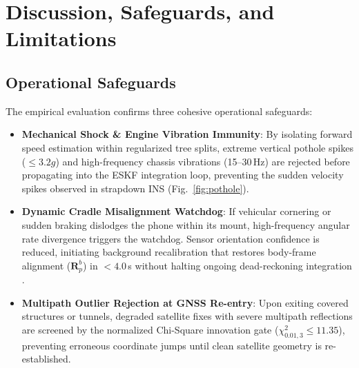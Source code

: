 \documentclass[conference]{IEEEtran}
\begin{document}
\section{Discussion, Safeguards, and Limitations}

\subsection{Operational Safeguards}
The empirical evaluation confirms three cohesive operational safeguards:
\begin{itemize}
\item \textbf{Mechanical Shock \& Engine Vibration Immunity}: By isolating forward speed estimation within regularized tree splits, extreme vertical pothole spikes ($\le 3.2g$) and high-frequency chassis vibrations (15--30\,Hz) are rejected before propagating into the ESKF integration loop, preventing the sudden velocity spikes observed in strapdown INS (Fig.~\ref{fig:pothole}).
\item \textbf{Dynamic Cradle Misalignment Watchdog}: If vehicular cornering or sudden braking dislodges the phone within its mount, high-frequency angular rate divergence triggers the watchdog. Sensor orientation confidence is reduced, initiating background recalibration that restores body-frame alignment ($\mathbf{R}_p^b$) in $<4.0$\,s without halting ongoing dead-reckoning integration \cite{matos2025}.
\item \textbf{Multipath Outlier Rejection at GNSS Re-entry}: Upon exiting covered structures or tunnels, degraded satellite fixes with severe multipath reflections are screened by the normalized Chi-Square innovation gate ($\chi^2_{0.01, 3} \le 11.35$), preventing erroneous coordinate jumps until clean satellite geometry is re-established.
\end{itemize}
\end{document}
